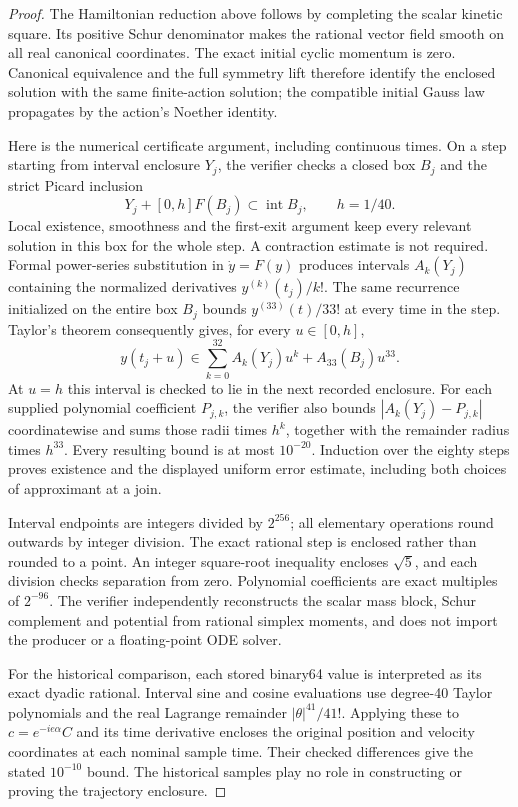 \begin{proof}
The Hamiltonian reduction above follows by completing the scalar kinetic
square. Its positive Schur denominator makes the rational vector field
smooth on all real canonical coordinates. The exact initial cyclic momentum
is zero. Canonical equivalence and the full symmetry lift therefore identify
the enclosed solution with the same finite-action solution; the compatible
initial Gauss law propagates by the action's Noether identity.

Here is the numerical certificate argument, including continuous times.
On a step starting from interval enclosure \(Y_j\), the verifier checks a
closed box \(B_j\) and the strict Picard inclusion
\[
 Y_j+[0,h]F(B_j)\subset\operatorname{int}B_j,
 \qquad h=1/40.
\]
Local existence, smoothness and the first-exit argument keep every relevant
solution in this box for the whole step. A contraction estimate is not
required. Formal power-series substitution in \(\dot y=F(y)\) produces
intervals \(A_k(Y_j)\) containing the normalized derivatives
\(y^{(k)}(t_j)/k!\). The same recurrence initialized on the entire box
\(B_j\) bounds \(y^{(33)}(t)/33!\) at every time in the step. Taylor's
theorem consequently gives, for every \(u\in[0,h]\),
\[
 y(t_j+u)\in\sum_{k=0}^{32}A_k(Y_j)u^k+A_{33}(B_j)u^{33}.
\]
At \(u=h\) this interval is checked to lie in the next recorded enclosure.
For each supplied polynomial coefficient \(P_{j,k}\), the verifier also
bounds \(|A_k(Y_j)-P_{j,k}|\) coordinatewise and sums those radii times
\(h^k\), together with the remainder radius times \(h^{33}\).
Every resulting bound is at most \(10^{-20}\). Induction over the eighty
steps proves existence and the displayed uniform error estimate, including
both choices of approximant at a join.

Interval endpoints are integers divided by \(2^{256}\); all elementary
operations round outwards by integer division. The exact rational step is
enclosed rather than rounded to a point. An integer square-root inequality
encloses \(\sqrt5\), and each division checks separation from zero.
Polynomial coefficients are exact multiples of \(2^{-96}\).
The verifier independently reconstructs the scalar mass block, Schur
complement and potential from rational simplex moments, and does not import
the producer or a floating-point ODE solver.

For the historical comparison, each stored binary64 value is interpreted
as its exact dyadic rational. Interval sine and cosine evaluations use
degree-40 Taylor polynomials and the real Lagrange remainder
\(|\theta|^{41}/41!\). Applying these to \(c=e^{-ie\alpha}C\) and its
time derivative encloses the original position and velocity coordinates at
each nominal sample time. Their checked differences give the stated
\(10^{-10}\) bound. The historical samples play no role in constructing or
proving the trajectory enclosure.
\end{proof}


